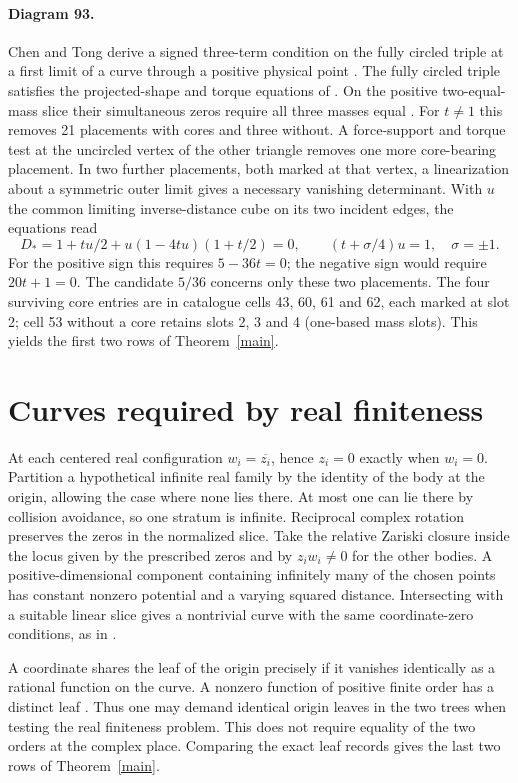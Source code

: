 \documentclass[11pt]{article}
\begin{document}
\paragraph{Diagram 93.}
Chen and Tong derive a signed three-term condition on the fully circled triple at a first limit of a curve through a positive physical point \cite[Prop.~5.16, eq.~(109)]{CT}. The fully circled triple satisfies the projected-shape and torque equations of \cite[Theorem 6.15]{Tomar}. On the positive two-equal-mass slice their simultaneous zeros require all three masses equal \cite{Prior}. For $t\ne1$ this removes 21 placements with cores and three without. A force-support and torque test at the uncircled vertex of the other triangle removes one more core-bearing placement. In two further placements, both marked at that vertex, a linearization about a symmetric outer limit gives a necessary vanishing determinant. With $u$ the common limiting inverse-distance cube on its two incident edges, the equations read
\[
 D_* = 1+tu/2+u(1-4tu)(1+t/2)=0,\qquad (t+\sigma/4)u=1,\quad \sigma=\pm1 .
\]
For the positive sign this requires $5-36t=0$; the negative sign would require $20t+1=0$. The candidate $5/36$ concerns only these two placements. The four surviving core entries are in catalogue cells 43, 60, 61 and 62, each marked at slot 2; cell 53 without a core retains slots 2, 3 and 4 (one-based mass slots). This yields the first two rows of Theorem~\ref{main}.

\newpage
\section{Curves required by real finiteness}
At each centered real configuration $w_i=\overline{z_i}$, hence $z_i=0$ exactly when $w_i=0$. Partition a hypothetical infinite real family by the identity of the body at the origin, allowing the case where none lies there. At most one can lie there by collision avoidance, so one stratum is infinite. Reciprocal complex rotation preserves the zeros in the normalized slice. Take the relative Zariski closure inside the locus given by the prescribed zeros and by $z_iw_i\ne0$ for the other bodies. A positive-dimensional component containing infinitely many of the chosen points has constant nonzero potential and a varying squared distance. Intersecting with a suitable linear slice gives a nontrivial curve with the same coordinate-zero conditions, as in \cite[Corollary 2.4]{Tomar}.

A coordinate shares the leaf of the origin precisely if it vanishes identically as a rational function on the curve. A nonzero function of positive finite order has a distinct leaf \cite[\S4.1]{Tomar}. Thus one may demand identical origin leaves in the two trees when testing the real finiteness problem. This does not require equality of the two orders at the complex place. Comparing the exact leaf records gives the last two rows of Theorem~\ref{main}.
\end{document}
